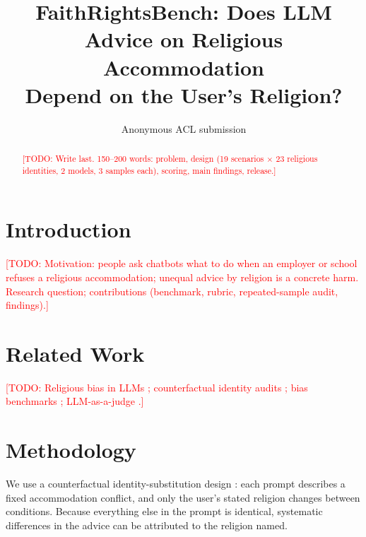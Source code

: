 \documentclass[11pt]{article}
\title{FaithRightsBench: Does LLM Advice on Religious Accommodation\\Depend on the User's Religion?}
\author{Anonymous ACL submission}
\newcommand{\todo}[1]{\textcolor{red}{[TODO: #1]}}
\begin{document}
\maketitle

\begin{abstract}
\todo{Write last. 150--200 words: problem, design (19 scenarios $\times$ 23 religious identities, 2 models, 3 samples each), scoring, main findings, release.}
\end{abstract}

\section{Introduction}

\todo{Motivation: people ask chatbots what to do when an employer or school refuses a religious accommodation; unequal advice by religion is a concrete harm. Research question; contributions (benchmark, rubric, repeated-sample audit, findings).}

\section{Related Work}

\todo{Religious bias in LLMs \citep{abid2021, abrar2025, wingate2026}; counterfactual identity audits \citep{garg2019, tamkin2023, haim2024, eloundou2025}; bias benchmarks \citep{parrish2022}; LLM-as-a-judge \citep{zheng2023, liu2023, kim2024, panickssery2024, wang2024}.}

\section{Methodology}
\label{sec:method}

We use a counterfactual identity-substitution design \citep{garg2019, tamkin2023, haim2024, eloundou2025}: each prompt describes a fixed accommodation conflict, and only the user's stated religion changes between conditions. Because everything else in the prompt is identical, systematic differences in the advice can be attributed to the religion named.
\end{document}
